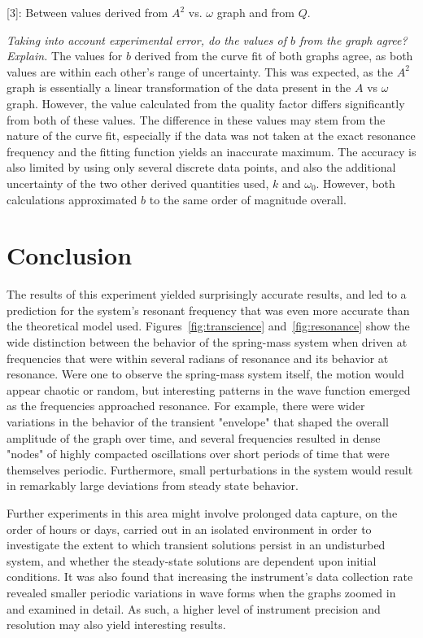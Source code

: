 \documentclass[twocolumn,english]{IEEEtran}
\theoremstyle{plain}
\theoremstyle{plain}
\begin{document}
[3]: Between values derived from $A^2$ vs. $\omega$ graph and from $Q$.

\textit{Taking into account experimental error, do the values of $b$ from the graph agree? Explain.}
The values for $b$ derived from the curve fit of both graphs agree, as both values are within each other's range of uncertainty. This was expected, as the $A^2$ graph is essentially a linear transformation of the data present in the $A$ vs $\omega$ graph. However, the value calculated from the quality factor differs significantly from both of these values. The difference in these values may stem from the nature of the curve fit, especially if the data was not taken at the exact resonance frequency and the fitting function yields an inaccurate maximum. The accuracy is also limited by using only several discrete data points, and also the additional uncertainty of the two other derived quantities used, $k$ and $\omega_0$. However, both calculations approximated $b$ to the same order of magnitude overall.
\section{Conclusion}
The results of this experiment yielded surprisingly accurate results, and led to a prediction for the system's resonant frequency that was even more accurate than the theoretical model used. Figures~\ref{fig:transcience} and~\ref{fig:resonance} show the wide distinction between the behavior of the spring-mass system when driven at frequencies that were within several radians of resonance and its behavior at resonance. Were one to observe the spring-mass system itself, the motion would appear chaotic or random, but interesting patterns in the wave function emerged as the frequencies approached resonance. For example, there were wider variations in the behavior of the transient "envelope" that shaped the overall amplitude of the graph over time, and several frequencies resulted in dense "nodes" of highly compacted oscillations over short periods of time that were themselves periodic. Furthermore, small perturbations in the system would result in remarkably large deviations from steady state behavior.

Further experiments in this area might involve prolonged data capture, on the order of hours or days, carried out in an isolated environment in order to investigate the extent to which transient solutions persist in an undisturbed system, and whether the steady-state solutions are dependent upon initial conditions. It was also found that increasing the instrument's data collection rate revealed smaller periodic variations in wave forms when the graphs zoomed in and examined in detail. As such, a higher level of instrument precision and resolution may also yield interesting results.
\end{document}
